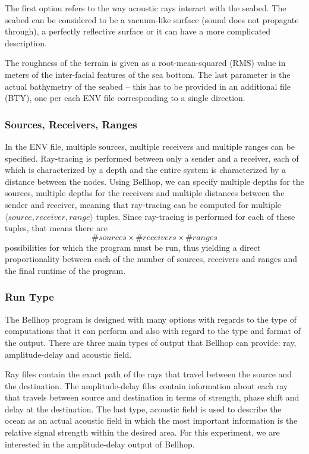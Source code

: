 \documentclass[a4paper]{IEEEtran}
\begin{document}
The first option refers to the way acoustic rays interact with the
seabed. The seabed can be considered to be a vacuum-like surface
(sound does not propagate through), a perfectly reflective surface or
it can have a more complicated description.

The roughness of the terrain is given as a root-mean-squared (RMS)
value in meters of the inter-facial features of the sea bottom. The
last parameter is the actual bathymetry of the seabed -- this has to
be provided in an additional file (BTY), one per each ENV file
corresponding to a single direction.

\subsubsection{Sources, Receivers, Ranges}
In the ENV file, multiple sources, multiple receivers and multiple
ranges can be specified. Ray-tracing is performed between only a
sender and a receiver, each of which is characterized by a depth and
the entire system is characterized by a distance between the
nodes. Using Bellhop, we can specify multiple depths for the sources,
multiple depths for the receivers and multiple distances between the
sender and receiver, meaning that ray-tracing can be computed
for multiple $\langle source,receiver,range \rangle$ tuples. Since
ray-tracing is performed for each of these tuples, that means there
are $$\#sources \times \#receivers \times \#ranges$$ possibilities for which the
program must be run, thus yielding a direct proportionality between each of
the number of sources, receivers and ranges and the final runtime of
the program.

\subsubsection{Run Type}
The Bellhop program is designed with many options with regards to the
type of computations that it can perform and also with regard to the
type and format of the output. There are three main types of output
that Bellhop can provide: ray, amplitude-delay and acoustic field.

Ray files contain the exact path of the rays that travel between the
source and the destination. The amplitude-delay files contain
information about each ray that travels between source and destination
in terms of strength, phase shift and delay at the destination. The
last type, acoustic field is used to describe the ocean as an actual
acoustic field in which the most important information is the relative
signal strength within the desired area. For this experiment, we are
interested in the amplitude-delay output of Bellhop.
\end{document}
